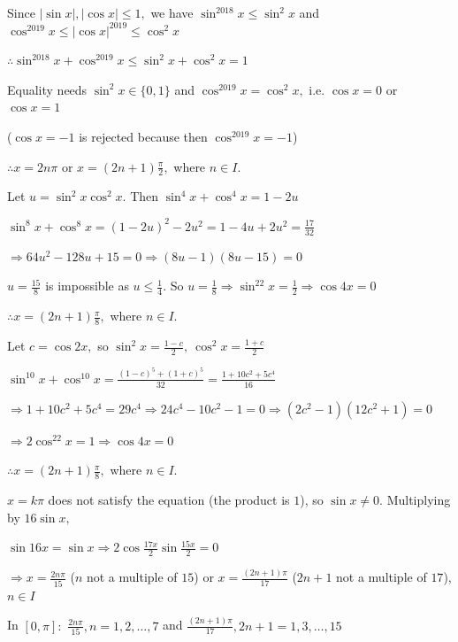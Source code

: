 \subject{Challenging Problems}
\startitemize[n, 1*broad]
\item Since $|\sin x|, |\cos x|\leq 1,$ we have $\sin^{2018}x\leq\sin^2x$ and $\cos^{2019}x\leq|\cos x|^{2019}\leq\cos^2x$

  $\therefore \sin^{2018}x + \cos^{2019}x\leq \sin^2x + \cos^2x = 1$

  Equality needs $\sin^2x\in\{0, 1\}$ and $\cos^{2019}x = \cos^2x,$ i.e. $\cos x = 0$ or $\cos x = 1$

  ($\cos x = -1$ is rejected because then $\cos^{2019}x = -1$)

  $\therefore x = 2n\pi$ or $x = (2n + 1)\frac{\pi}{2},$ where $n\in I.$

\item Let $u = \sin^2x\cos^2x.$ Then $\sin^4x + \cos^4x = 1 - 2u$

  $\sin^8x + \cos^8x = (1 - 2u)^2 - 2u^2 = 1 - 4u + 2u^2 = \frac{17}{32}$

  $\Rightarrow 64u^2 - 128u + 15 = 0 \Rightarrow (8u - 1)(8u - 15) = 0$

  $u = \frac{15}{8}$ is impossible as $u\leq\frac{1}{4}.$ So $u = \frac{1}{8}\Rightarrow \sin^22x = \frac{1}{2}\Rightarrow
  \cos4x = 0$

  $\therefore x = (2n + 1)\frac{\pi}{8},$ where $n\in I.$

\item Let $c = \cos2x,$ so $\sin^2x = \frac{1 - c}{2},~\cos^2x = \frac{1 + c}{2}$

  $\sin^{10}x + \cos^{10}x = \frac{(1 - c)^5 + (1 + c)^5}{32} = \frac{1 + 10c^2 + 5c^4}{16}$

  $\Rightarrow 1 + 10c^2 + 5c^4 = 29c^4 \Rightarrow 24c^4 - 10c^2 - 1 = 0 \Rightarrow (2c^2 - 1)(12c^2 + 1) = 0$

  $\Rightarrow 2\cos^22x = 1 \Rightarrow \cos4x = 0$

  $\therefore x = (2n + 1)\frac{\pi}{8},$ where $n\in I.$

\item $x = k\pi$ does not satisfy the equation (the product is $1$), so $\sin x\neq 0.$ Multiplying by $16\sin x,$

  $\sin16x = \sin x \Rightarrow 2\cos\frac{17x}{2}\sin\frac{15x}{2} = 0$

  $\Rightarrow x = \frac{2n\pi}{15}$ ($n$ not a multiple of $15$) or $x = \frac{(2n + 1)\pi}{17}$ ($2n + 1$ not a multiple
  of $17$), $n\in I$

  In $[0, \pi]:$ $\frac{2n\pi}{15}, n = 1, 2, \ldots, 7$ and $\frac{(2n + 1)\pi}{17}, 2n + 1 = 1, 3, \ldots, 15$

